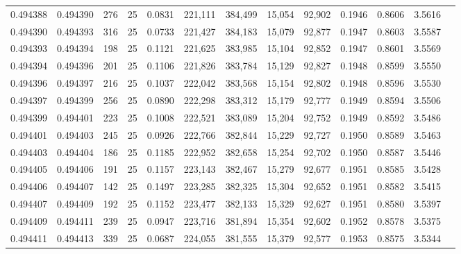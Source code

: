 \begin{tabular}{rrrrrrrrrrrrr}
0.494388 & 0.494390 &   276 &  25 &                                     0.0831 & 221,111 & 384,499 &  15,054 &  92,902 & 0.1946 & 0.8606 & 3.5616 \\
0.494390 & 0.494393 &   316 &  25 &                                     0.0733 & 221,427 & 384,183 &  15,079 &  92,877 & 0.1947 & 0.8603 & 3.5587 \\
0.494393 & 0.494394 &   198 &  25 &                                     0.1121 & 221,625 & 383,985 &  15,104 &  92,852 & 0.1947 & 0.8601 & 3.5569 \\
0.494394 & 0.494396 &   201 &  25 &                                     0.1106 & 221,826 & 383,784 &  15,129 &  92,827 & 0.1948 & 0.8599 & 3.5550 \\
0.494396 & 0.494397 &   216 &  25 &                                     0.1037 & 222,042 & 383,568 &  15,154 &  92,802 & 0.1948 & 0.8596 & 3.5530 \\
0.494397 & 0.494399 &   256 &  25 &                                     0.0890 & 222,298 & 383,312 &  15,179 &  92,777 & 0.1949 & 0.8594 & 3.5506 \\
0.494399 & 0.494401 &   223 &  25 &                                     0.1008 & 222,521 & 383,089 &  15,204 &  92,752 & 0.1949 & 0.8592 & 3.5486 \\
0.494401 & 0.494403 &   245 &  25 &                                     0.0926 & 222,766 & 382,844 &  15,229 &  92,727 & 0.1950 & 0.8589 & 3.5463 \\
0.494403 & 0.494404 &   186 &  25 &                                     0.1185 & 222,952 & 382,658 &  15,254 &  92,702 & 0.1950 & 0.8587 & 3.5446 \\
0.494405 & 0.494406 &   191 &  25 &                                     0.1157 & 223,143 & 382,467 &  15,279 &  92,677 & 0.1951 & 0.8585 & 3.5428 \\
0.494406 & 0.494407 &   142 &  25 &                                     0.1497 & 223,285 & 382,325 &  15,304 &  92,652 & 0.1951 & 0.8582 & 3.5415 \\
0.494407 & 0.494409 &   192 &  25 &                                     0.1152 & 223,477 & 382,133 &  15,329 &  92,627 & 0.1951 & 0.8580 & 3.5397 \\
0.494409 & 0.494411 &   239 &  25 &                                     0.0947 & 223,716 & 381,894 &  15,354 &  92,602 & 0.1952 & 0.8578 & 3.5375 \\
0.494411 & 0.494413 &   339 &  25 &                                     0.0687 & 224,055 & 381,555 &  15,379 &  92,577 & 0.1953 & 0.8575 & 3.5344 \\

\end{tabular}
